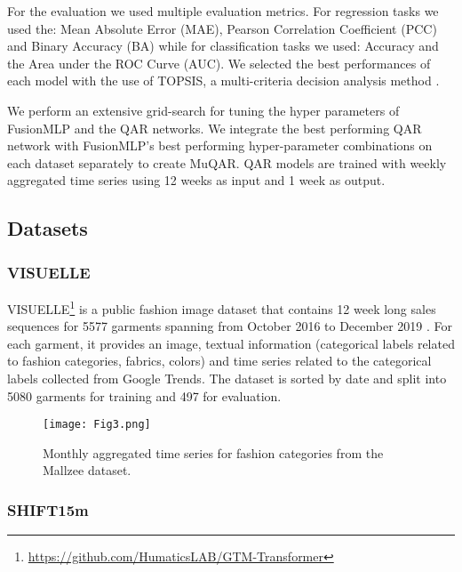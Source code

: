 \documentclass{article}
\begin{document}
For the evaluation we used multiple evaluation metrics. For regression tasks we used the: Mean Absolute Error (MAE), Pearson Correlation Coefficient (PCC) and Binary Accuracy (BA) while for classification tasks we used: Accuracy and the Area under the ROC Curve (AUC). We selected the best performances of each model with the use of TOPSIS, a multi-criteria decision analysis method \cite{hwang1981methods}. 

We perform an extensive grid-search for tuning the hyper parameters of FusionMLP and the QAR networks. 
We integrate the best performing QAR network with FusionMLP's best performing hyper-parameter combinations on each dataset separately to create MuQAR.
QAR models are trained with weekly aggregated time series using 12 weeks as input and 1 week as output.

\subsection{Datasets}
\label{section:datasets}

\subsubsection{\textbf{VISUELLE}}



VISUELLE\footnote{\url{https://github.com/HumaticsLAB/GTM-Transformer}} is a public fashion image dataset that contains 12 week long sales sequences for 5577 garments spanning from October 2016 to December 2019 \cite{skenderi2021well}. For each garment, it provides an image, textual information (categorical labels related to fashion categories, fabrics, colors) and time series related to the categorical labels collected from Google Trends. 
The dataset is sorted by date and split into 5080 garments for training and 497 for evaluation. 

\begin{figure*}[ht]
    \centering
    \texttt{[image: Fig3.png]}
    \caption{Monthly aggregated time series for fashion categories from the Mallzee dataset.}
    \label{fig:timeseries}
\end{figure*}

\subsubsection{\textbf{SHIFT15m}}
\end{document}
